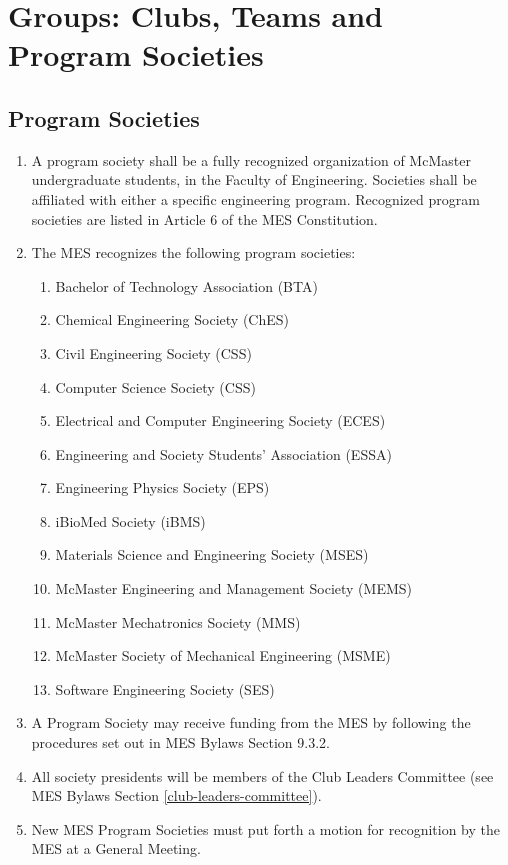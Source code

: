 \section{Groups: Clubs, Teams and Program Societies}
\label{groups-clubs-teams-and-program-societies}

\subsection{Program Societies}
\label{program-societies}
\begin{enumerate}
 \item
  A program society shall be a fully recognized organization of McMaster undergraduate students, in the Faculty of Engineering. Societies shall be affiliated with either a specific engineering program. Recognized program societies are listed in Article 6 of the MES Constitution. 
 \item
  The MES recognizes the following program societies:

  \begin{enumerate}
   \item
    Bachelor of Technology Association (BTA)
   \item
    Chemical Engineering Society (ChES)
   \item
    Civil Engineering Society (CSS)
   \item
    Computer Science Society (CSS)
   \item
    Electrical and Computer Engineering Society (ECES)
   \item
    Engineering and Society Students' Association (ESSA)
   \item
    Engineering Physics Society (EPS)
   \item
    iBioMed Society (iBMS)
   \item
    Materials Science and Engineering Society (MSES)
   \item
    McMaster Engineering and Management Society (MEMS)
   \item
    McMaster Mechatronics Society (MMS)
   \item
    McMaster Society of Mechanical Engineering (MSME)
   \item
    Software Engineering Society (SES)
  \end{enumerate}
 \item
  A Program Society may receive funding from the MES by following the procedures set out in MES Bylaws Section 9.3.2.
 \item
  All society presidents will be members of the Club Leaders Committee (see MES Bylaws Section \ref{club-leaders-committee}).
 \item
  New MES Program Societies must put forth a motion for recognition by the MES at a General Meeting.

\end{enumerate}

